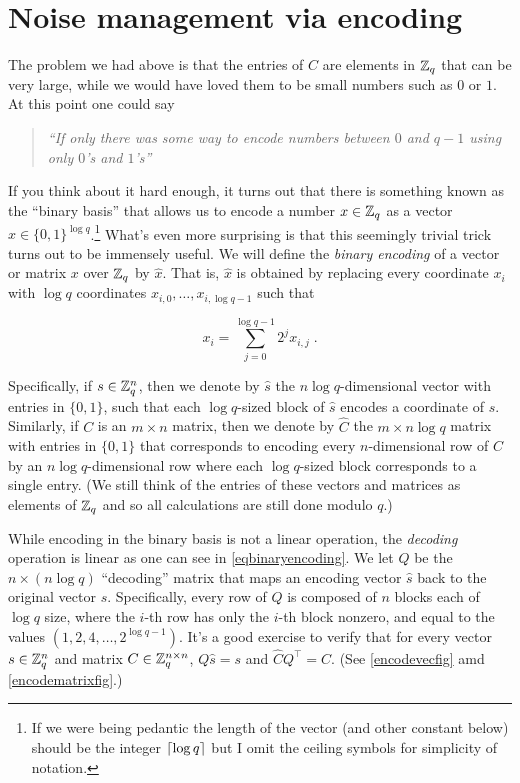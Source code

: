 \section{Noise management via encoding}\label{15-Noise-management-via-e}

The problem we had above is that the entries of \(C\) are elements in
\({\mathbb{Z}}_q\) that can be very large, while we would have loved them to be
small numbers such as \(0\) or \(1\). At this point one could say

\begin{quote}
\emph{``If only there was some way to encode numbers between \(0\) and
\(q-1\) using only \(0\)'s and \(1\)'s''}
\end{quote}

If you think about it hard enough, it turns out that there is something
known as the ``binary basis'' that allows us to encode a number
\(x\in{\mathbb{Z}}_q\) as a vector \(\hat{x}\in\{0,1\}^{\log q}\).\footnote{If we
  were being pedantic the length of the vector (and other constant
  below) should be the integer \(\lceil \log q \rceil\) but I omit the ceiling
  symbols for simplicity of notation.} What's even more surprising is
that this seemingly trivial trick turns out to be immensely useful. We
will define the \emph{binary encoding} of a vector or matrix \(x\) over
\({\mathbb{Z}}_q\) by \(\hat{x}\). That is, \(\hat{x}\) is obtained by replacing
every coordinate \(x_i\) with \(\log q\) coordinates
\(x_{i,0},\ldots,x_{i,\log q-1}\) such that

\[x_i = \sum_{j=0}^{\log q-1}2^j x_{i,j} \;. \label{eqbinaryencoding}\]

Specifically, if \(s\in {\mathbb{Z}}_q^n\), then we denote by \(\hat{s}\) the
\(n\log q\)-dimensional vector with entries in \(\{0,1\}\), such that
each \(\log q\)-sized block of \(\hat{s}\) encodes a coordinate of
\(s\). Similarly, if \(C\) is an \(m\times n\) matrix, then we denote by
\(\hat{C}\) the \(m\times n\log q\) matrix with entries in \(\{0,1\}\)
that corresponds to encoding every \(n\)-dimensional row of \(C\) by an
\(n\log q\)-dimensional row where each \(\log q\)-sized block
corresponds to a single entry. (We still think of the entries of these
vectors and matrices as elements of \({\mathbb{Z}}_q\) and so all calculations are
still done modulo \(q\).)

While encoding in the binary basis is not a linear operation, the
\emph{decoding} operation is linear as one can see in
\eqref{eqbinaryencoding}. We let \(Q\) be the \(n \times (n\log q)\)
``decoding'' matrix that maps an encoding vector \(\hat{s}\) back to the
original vector \(s\). Specifically, every row of \(Q\) is composed of
\(n\) blocks each of \(\log q\) size, where the \(i\)-th row has only
the \(i\)-th block nonzero, and equal to the values
\((1,2,4,\ldots,2^{\log q-1})\). It's a good exercise to verify that for
every vector \(s\in {\mathbb{Z}}_q^n\) and matrix \(C\in {\mathbb{Z}}_q^{n\times n}\),
\(Q\hat{s}=s\) and \(\hat{C}Q^\top =C\). (See \cref{encodevecfig} amd
\cref{encodematrixfig}.)

